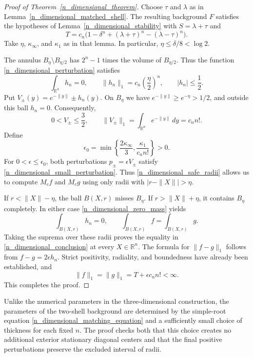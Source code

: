 \documentclass[12pt]{amsart}
\numberwithin{equation}{section}
\begin{document}
\begin{proof}[Proof of Theorem~\ref{n_dimensional_theorem}]
Choose $\tau$ and $\lambda$ as in
Lemma~\ref{n_dimensional_matched_shell}. The resulting background
$F$ satisfies the hypotheses of Lemma~\ref{n_dimensional_stability}
with $S=\lambda+\tau$ and
\begin{equation}
\label{n_dimensional_total_mass}
T=c_n\bigl(1-\delta^n+(\lambda+\tau)^n-(\lambda-\tau)^n\bigr).
\end{equation}
Take $\eta$, $\kappa_\infty$, and $\kappa_1$ as in that lemma.
In particular, $\eta\leq\delta/8<\log2$.

The annulus $B_\eta\setminus B_{\eta/2}$ has $2^n-1$ times the
volume of $B_{\eta/2}$. Thus the function
\eqref{n_dimensional_perturbation} satisfies
\begin{equation}
\label{n_dimensional_zero_mass}
\int_{\mathbb{R}^n}h_n=0,
\qquad \|h_n\|_1=c_n\left(\frac{\eta}{2}\right)^n,
\qquad |h_n|\leq\frac12.
\end{equation}
Put $V_\pm(y)=e^{-\|y\|}\pm h_n(y)$. On $B_\eta$ we have
$e^{-\|y\|}\geq e^{-\eta}>1/2$, and outside this ball $h_n=0$.
Consequently,
\[
0<V_\pm\leq\frac32,
\qquad
\|V_\pm\|_1=\int_{\mathbb{R}^n}e^{-\|y\|}\,dy=c_n n!.
\]
Define
\begin{equation}
\label{n_dimensional_epsilon_choice}
\epsilon_0=\min\left\{\frac{2\kappa_\infty}{3},
                         \frac{\kappa_1}{c_n n!}\right\}>0.
\end{equation}
For $0<\epsilon\leq\epsilon_0$, both perturbations
$p_\pm=\epsilon V_\pm$ satisfy
\eqref{n_dimensional_small_perturbation}. Thus
\eqref{n_dimensional_safe_radii} allows us to compute $M_cf$ and
$M_cg$ using only radii with \mbox{$|r-\|X\||>\eta$}.

If $r<\|X\|-\eta$, the ball $B(X,r)$ misses $B_\eta$.
If $r>\|X\|+\eta$, it contains $B_\eta$ completely.
In either case \eqref{n_dimensional_zero_mass} yields
\[
\int_{B(X,r)}h_n=0,\qquad
\int_{B(X,r)}f=\int_{B(X,r)}g.
\]
Taking the suprema over these radii proves the equality in
\eqref{n_dimensional_conclusion} at every $X\in\mathbb{R}^n$.
The formula for $\|f-g\|_1$ follows from $f-g=2\epsilon h_n$.
Strict positivity, radiality, and boundedness have already been
established, and
\[
\|f\|_1=\|g\|_1=T+\epsilon c_n n!<\infty.
\]
This completes the proof.
\end{proof}

Unlike the numerical parameters in the three-dimensional construction,
the parameters of the two-shell background are determined by the
simple-root equation \eqref{n_dimensional_matching_equation} and a
sufficiently small choice of thickness for each fixed $n$. The proof
checks both that this choice creates no additional exterior stationary
diagonal centers and that the final positive perturbations preserve
the excluded interval of radii.
\end{document}
